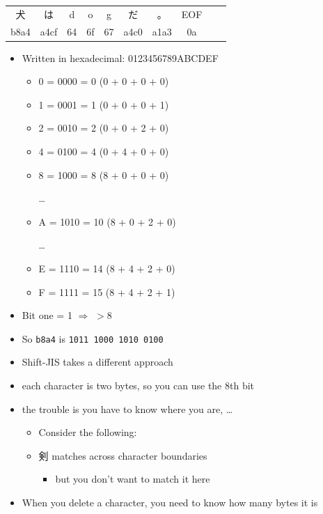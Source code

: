\documentclass[a4paper,landscape,headrule,footrule,xetex]{foils}
\begin{document}


\begin{tabular}{cccccccccc}
  犬 & は & d & o & g & だ & 。& EOF \\
 b8a4 & a4cf & 64 & 6f & 67 & a4c0 &a1a3 &0a\\
\end{tabular}

\begin{itemize}
\item Written in hexadecimal: 0123456789ABCDEF  
  \begin{itemize}
  \item 0 = 0000 = 0  (0 + 0 + 0 + 0)
  \item 1 = 0001 = 1  (0 + 0 + 0 + 1)
  \item 2 = 0010 = 2  (0 + 0 + 2 + 0)
  \item 4 = 0100 = 4  (0 + 4 + 0 + 0)
  \item 8 = 1000 = 8  (8 + 0 + 0 + 0)
    \item[\ldots]
  \item A = 1010 = 10 (8 + 0 + 2 + 0)
    \item[\ldots]
  \item E = 1110 = 14 (8 + 4 + 2 + 0)
  \item F = 1111 = 15 (8 + 4 + 2 + 1)
  \end{itemize}
\item Bit one = 1 $\Rightarrow$ $> 8$
\item So  \texttt{b8a4} is \texttt{1011\,1000 1010\,0100}

\end{itemize}


\begin{itemize}
\item Shift-JIS takes a different approach
\item each character is two bytes, so you can use the 8th bit
\item the trouble is you have to know where you are, \ldots
  \begin{itemize}
  \item Consider the following:
  \item  剣  matches across character boundaries
    \begin{itemize}
    \item but you don't want to match it here
    \end{itemize}
  \end{itemize}
  \item When you delete a character, you need to know how many bytes it is
\end{itemize}
\end{document}
